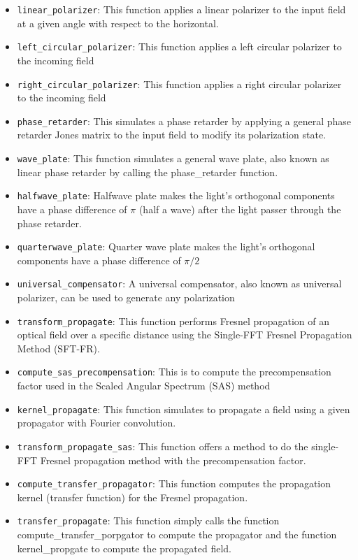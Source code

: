 \documentclass[a4paper,12pt]{report}
\begin{document}
\begin{itemize}
    \item \texttt{linear\_polarizer}: This function applies a linear polarizer to the input field at a given angle with respect to the horizontal.
    \item \texttt{left\_circular\_polarizer}: This function applies a left circular polarizer to the incoming field
    \item \texttt{right\_circular\_polarizer}: This function applies a right circular polarizer to the incoming field
    \item \texttt{phase\_retarder}: This simulates a phase retarder by applying a general phase retarder Jones matrix to the input field to modify its polarization state.
    \item \texttt{wave\_plate}: This function simulates a general wave plate, also known as linear phase retarder by calling the phase\_retarder function.
    \item \texttt{halfwave\_plate}: Halfwave plate makes the light's orthogonal components have a phase difference of $\pi$ (half a wave) after the light passer through the phase retarder.
    \item \texttt{quarterwave\_plate}: Quarter wave plate makes the light's orthogonal components have a phase difference of $\pi/2$
    \item \texttt{universal\_compensator}: A universal compensator, also known as universal polarizer, can be used to generate any polarization
    \item \texttt{transform\_propagate}: This function performs Fresnel propagation of an optical field over a specific distance using the Single-FFT Fresnel Propagation Method (SFT-FR).
    \item \texttt{compute\_sas\_precompensation}: This is to compute the precompensation factor used in the Scaled Angular Spectrum (SAS) method
    \item \texttt{kernel\_propagate}: This function simulates to propagate a field using a given propagator with Fourier convolution.
    \item \texttt{transform\_propagate\_sas}: This function offers a method to do the single-FFT Fresnel propagation method with the precompensation factor.
    \item \texttt{compute\_transfer\_propagator}: This function computes the propagation kernel (transfer function) for the Fresnel propagation.
    \item \texttt{transfer\_propagate}: This function simply calls the function compute\_transfer\_porpgator to compute the propagator and the function kernel\_propgate to compute the propagated field.

\end{itemize}
\end{document}
